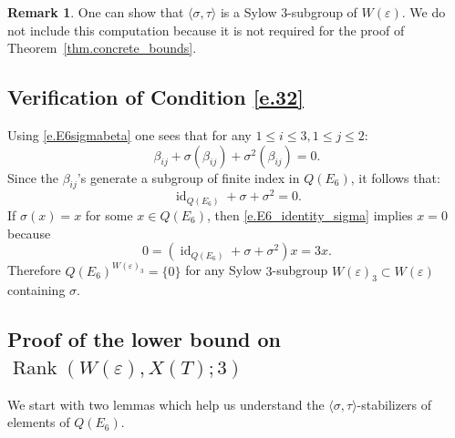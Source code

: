 \documentclass[12pt]{amsart}
\numberwithin{equation}{section}
\theoremstyle{definition}
\newtheorem{remark}[theorem]{Remark}
\newcommand{\id}{\operatorname{id}}
\newcommand{\SymRank}{\operatorname{Rank}}
\newcommand{\eps}{\varepsilon}
\begin{document}
\begin{remark}
    One can show that $\langle\sigma,\tau \rangle$ is a Sylow $3$-subgroup of $W(\eps)$. We do not include this computation because it is not required for the proof of Theorem~\ref{thm.concrete_bounds}.
\end{remark}

\subsection*{Verification of Condition \eqref{e.32}}
Using \eqref{e.E6sigmabeta} one sees that for any $1\leq i\leq 3, 1\leq j\leq 2$:
    $$\beta_{ij} + \sigma(\beta_{ij}) + \sigma^2(\beta_{ij}) = 0.$$
    Since the $\beta_{ij}$'s generate a subgroup of finite index in $Q(E_6)$, it follows that:
    \begin{equation}\label{e.E6_identity_sigma}
    \id_{Q(E_6)} + \sigma + \sigma^2 = 0.
    \end{equation}
    If $\sigma(x)= x$ for some $x\in Q(E_6)$, then \eqref{e.E6_identity_sigma} implies $x= 0$ because
    $$0 = (\id_{Q(E_6)} + \sigma + \sigma^2)x = 3x.$$
    Therefore $Q(E_6)^{W(\eps)_{3}} = \{0\}$ for any Sylow $3$-subgroup $W(\eps)_{3}\subset W(\eps)$ containing $\sigma$.


\subsection*{Proof of the lower bound on \texorpdfstring{$\SymRank(W(\eps),X(T);3)$}{the symmetric rank}}
We start with two lemmas which help us understand the $\langle \sigma,\tau\rangle$-stabilizers of elements of $Q(E_6)$.
\end{document}
